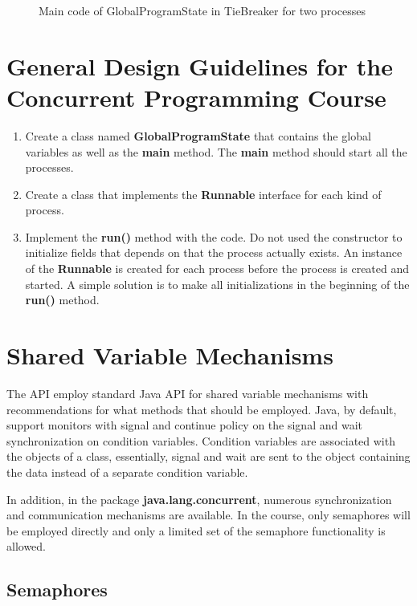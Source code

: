 \documentclass[11pt]{article} %
\begin{document}
\begin{figure}

\caption{Main code of GlobalProgramState in TieBreaker for two processes}
\label{fig:tieBreakerGPS}
\end{figure}


\section{General Design Guidelines for the Concurrent Programming Course}
\begin{enumerate}
\item Create a class named {\bfseries GlobalProgramState} that contains the global variables as well as the {\bfseries main} method. The {\bfseries main} method should start all the processes.
\item Create a class that implements the {\bfseries Runnable} interface for each kind of process.
\item Implement the {\bfseries run()} method with the code. Do not used the constructor to initialize fields that depends on that the process actually exists. An instance of the {\bfseries Runnable} is created for each process before the process is created and started. A simple solution is to make all initializations in the beginning of the {\bfseries run()} method. 
\end{enumerate}

\section{Shared Variable Mechanisms}

The API employ standard Java API for shared variable mechanisms with recommendations for what methods that should be employed. Java, by default, support monitors with signal and continue policy on the signal and wait synchronization on condition variables. Condition variables are associated with the objects of a class, essentially, signal and wait are sent to the object containing the data instead of a separate condition variable. 

In addition, in the package {\bfseries java.lang.concurrent}, numerous synchronization and communication mechanisms are available. In the course, only semaphores will be employed directly and only a limited set of the semaphore functionality is allowed. 

\subsection{Semaphores}
\label{sec:semaphores}
\end{document}
